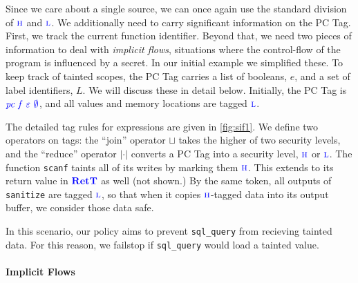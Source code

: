 \documentclass{llncs}
\begin{document}
Since we care about a single source, we can once again use the standard division of \(\textnormal{\color{blue} \sc h}\)
and \(\textnormal{\color{blue} \sc l}\). We additionally need to carry significant information on the PC Tag. First, we
track the current function identifier. Beyond that, we need two pieces of information to deal
with {\em implicit flows}, situations where the control-flow of the program is influenced by a secret.
In our initial example we simplified these. To keep track of tainted scopes, the
PC Tag carries a list of booleans, \(e\), and a set of label identifiers, \(L\).
We will discuss these in detail below. Initially, the PC Tag is \(\mathit{\color{blue} pc ~ f ~ \varepsilon ~ \emptyset}\),
and all values and memory locations are tagged \(\textnormal{\color{blue} \sc l}\).

The detailed tag rules for expressions are given in \cref{fig:sif1}. We define two operators on tags:
the ``join'' operator \(\sqcup\) takes the higher of two security levels, and the ``reduce''
operator \(| \cdot |\) converts a PC Tag into a security level, \(\textnormal{\color{blue} \sc h}\) or \(\textnormal{\color{blue} \sc l}\).
The function {\tt scanf} taints all of its writes by marking them \(\textnormal{\color{blue} \sc h}\). This extends to
its return value in \(\color{blue} \mathbf{RetT}\) as well (not shown.) By the same token, all outputs of
{\tt sanitize} are tagged \(\textnormal{\color{blue} \sc l}\), so that when it copies \(\textnormal{\color{blue} \sc h}\)-tagged data into its
output buffer, we consider those data safe.

In this scenario, our policy aims to prevent {\tt sql\_query} from recieving tainted data.
For this reason, we failstop if {\tt sql\_query} would load a tainted value.

\paragraph*{Implicit Flows}
\end{document}
